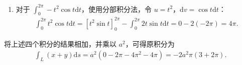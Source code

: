 \documentclass[../../main.tex]{subfiles}%
\begin{document}
\begin{solution}
\begin{enumerate}[(1)]
\begin{align*}
\end{align*}
\item 对于 \(\int_0^{2\pi} -t^2\cos t \mathrm{d}t\)，使用分部积分法，令 \(u=t^2\)，\( \mathrm{d}v=\cos t\mathrm{d}t \)：
\begin{align*}
\int_0^{2\pi} t^2\cos t \mathrm{d}t = [t^2\sin t]_0^{2\pi} - \int_0^{2\pi} 2t\sin t \mathrm{d}t = 0-2(-2\pi) = 4\pi.
\end{align*}
\end{enumerate}
将上述四个积分的结果相加，并乘以 \(a^2\)，可得原积分为
\begin{align*}
\int_L (x+y)\mathrm{d}s = a^2 \left( 0 - 2\pi - 4\pi^2 - 4\pi \right) = -2a^2\pi(3+2\pi).
\end{align*}
\end{solution}
\end{document}
